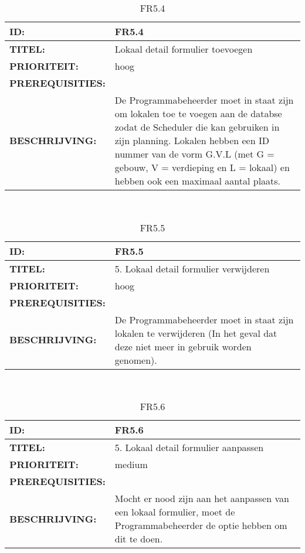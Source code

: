 \noindent\begin{table}[h]
            \begin{tabular}{l | p{10cm}}
                \textbf{ID:} & FR5.4 \\ \hline
                \textbf{TITEL:} & Lokaal detail formulier toevoegen\\ \hline
                \textbf{PRIORITEIT:} &  hoog \\ \hline
                \textbf{PREREQUISITIES:} & \\ \hline
                \textbf{BESCHRIJVING:} & De Programmabeheerder moet in staat zijn om lokalen toe te voegen aan de databse zodat de Scheduler die kan gebruiken in zijn planning. Lokalen hebben een ID nummer van de vorm G.V.L (met G = gebouw, V = verdieping en L = lokaal) en hebben ook een maximaal aantal plaats.\\ 
            \end{tabular}\\
            \caption{FR5.4}
            \label{tab:myfifteenthtable}
        \end{table}
        
\noindent\begin{table}[h]
            \begin{tabular}{l | p{10cm}}
                \textbf{ID:} & FR5.5 \\ \hline
                \textbf{TITEL:} & 5. Lokaal detail formulier verwijderen\\ \hline
                \textbf{PRIORITEIT:} &  hoog \\ \hline
                \textbf{PREREQUISITIES:} & \\ \hline
                \textbf{BESCHRIJVING:} & De Programmabeheerder moet in staat zijn lokalen te verwijderen (In het geval dat deze niet meer in gebruik worden genomen).\\ 
            \end{tabular}\\
            \caption{FR5.5}
            \label{tab:myfifteenthtable}
        \end{table}
        
\noindent\begin{table}[h]
            \begin{tabular}{l | p{10cm}}
                \textbf{ID:} & FR5.6 \\ \hline
                \textbf{TITEL:} & 5. Lokaal detail formulier aanpassen\\ \hline
                \textbf{PRIORITEIT:} &  medium \\ \hline
                \textbf{PREREQUISITIES:} & \\ \hline
                \textbf{BESCHRIJVING:} & Mocht er nood zijn aan het aanpassen van een lokaal formulier, moet de Programmabeheerder de optie hebben om dit te doen.\\ 
            \end{tabular}\\
            \caption{FR5.6}
            \label{tab:myfifteenthtable}
        \end{table}

